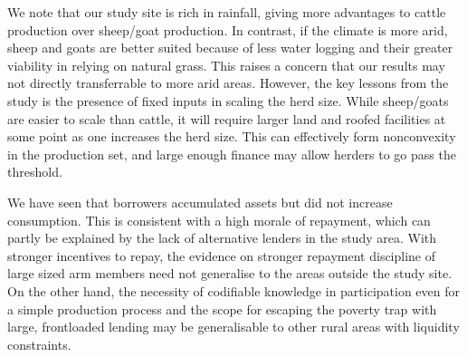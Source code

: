 
	We note that our study site is rich in rainfall, giving more advantages to cattle production over sheep/goat production. In contrast, if the climate is more arid, sheep and goats are better suited because of less water logging and their greater viability in relying on natural grass. This raises a concern that our results may not directly transferrable to more arid areas. However,  the key lessons from the study is the presence of fixed inputs in scaling the herd size. While sheep/goats are easier to scale than cattle, it will require larger land and roofed facilities at some point as one increases the herd size. This can effectively form nonconvexity in the production set, and large enough finance may allow herders to go pass the threshold. 

	We have seen that borrowers accumulated assets but did not increase consumption. This is consistent with a high morale of repayment, which can partly be explained by the lack of alternative lenders in the study area. With stronger incentives to repay, the evidence on stronger repayment discipline of large sized arm members need not generalise to the areas outside the study site. On the other hand, the necessity of codifiable knowledge in participation even for a simple production process and the scope for escaping the poverty trap with large, frontloaded lending may be generalisable to other rural areas with liquidity constraints.

{\footnotesize
\setlength{\baselineskip}{8pt}

}

\appendix
\setcounter{section}{0}
\setcounter{figure}{0}
\setcounter{table}{0}
\renewcommand{\thefigure}{\Alph{section}\arabic{figure}}
\renewcommand{\thetable}{\Alph{section}\arabic{table}}
\renewcommand{\thesection}{\Alph{section}}



